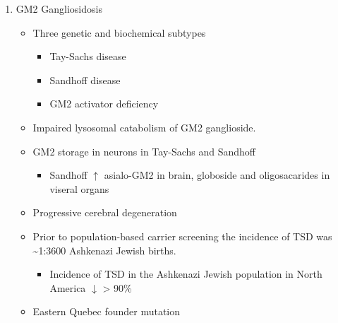 \documentclass{scrartcl}
\begin{document}
\begin{enumerate}
\begin{enumerate}
\begin{itemize}
\item \(\downarrow\) cathepsin A \(\to\) 2\degree  deficiency of NEU1
\begin{itemize}
\item ML-1 (sialidosis)
\end{itemize}
\end{itemize}

of the LMC and the CSER, and that become deregulated in case of
single or combined enzyme deficiencies in sialidosis, GM1 and
GS. CMA, chaperone mediated autophagy; CSER, cell surface elastin
receptor; EBP, elastin binding protein; ECM, extracellular matrix;
LM, lysosomal membrane; LMC, lysosomal multienzyme complex; PM,
plasma membrane
\begin{center}
\texttt{[image: ./GM1\_2/figures/lmc.jpg]}
\label{org6bc6547}
\end{center}

\item GM2 Gangliosidosis
\label{sec:orgfdf8ae0}
\begin{itemize}
\item Three genetic and biochemical subtypes
\begin{itemize}
\item Tay-Sachs disease
\item Sandhoff disease
\item GM2 activator deficiency
\end{itemize}
\item Impaired lysosomal catabolism of GM2 ganglioside.
\item GM2 storage in neurons in Tay-Sachs and Sandhoff
\begin{itemize}
\item Sandhoff \(\uparrow\) asialo-GM2 in brain, globoside and oligosacarides in viseral organs
\end{itemize}
\item Progressive cerebral degeneration
\item Prior to population-based carrier screening the incidence of TSD was \textasciitilde{}1:3600 Ashkenazi Jewish births.
\begin{itemize}
\item Incidence of TSD in the Ashkenazi Jewish population in North America \(\downarrow\) > 90\%
\end{itemize}
\item Eastern Quebec founder mutation
\end{itemize}



\end{enumerate}
\end{enumerate}
\end{document}
